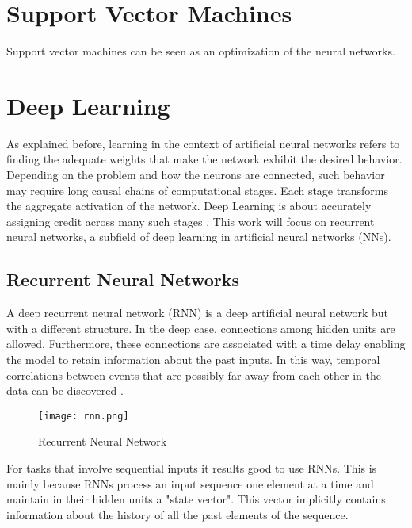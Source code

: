
\section{Support Vector Machines}
Support vector machines can be seen as an optimization of the neural networks. 
\section{Deep Learning}
As explained before, learning in the context of artificial neural networks refers to finding the adequate weights that make the network exhibit the desired behavior. Depending on the problem and how the neurons are connected, such behavior may require long causal chains of computational stages. Each stage transforms the aggregate activation of the network. Deep Learning is about accurately assigning credit across many such stages \cite{schmidhuber2015deep}. This work will focus on recurrent neural networks, a subfield of deep learning in artificial neural networks (NNs).

\subsection{Recurrent Neural Networks}

A deep recurrent neural network (RNN) is a deep artificial neural network but with a different structure. In the deep case, connections among hidden units are allowed. Furthermore, these connections are associated with a time delay enabling the model to retain information about the past inputs. In this way, temporal correlations between events that are possibly far away from each other in the data can be discovered \cite{pascanu2013difficulty}.

\begin{figure}
\label{fig:rnn}
\center
\texttt{[image: rnn.png]}
\caption{Recurrent Neural Network}
\end{figure}
For tasks that involve sequential inputs it results good to use RNNs. This is mainly because RNNs process an input sequence one element at a time and maintain in their hidden units a "state vector". This vector implicitly contains information about the history of all the past elements of the sequence.\cite{lecun2015deep} 

